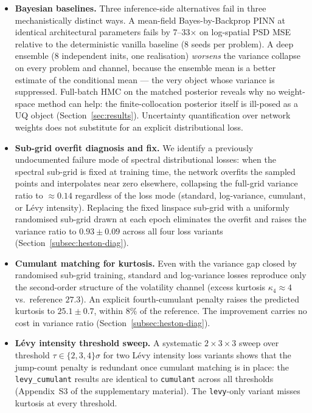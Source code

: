 \documentclass[review,12pt]{elsarticle}
\begin{document}
\begin{itemize}
\item \textbf{Bayesian baselines.} Three inference-side alternatives fail in
three mechanistically distinct ways. A mean-field Bayes-by-Backprop PINN at
identical architectural parameters fails by 7--33\(\times\) on log-spatial
PSD MSE relative to the deterministic vanilla baseline (8 seeds per
problem). A deep ensemble (8 independent inits, one realisation)
\emph{worsens} the variance collapse on every problem and channel, because
the ensemble mean is a better estimate of the conditional mean --- the very
object whose variance is suppressed. Full-batch HMC on the matched
posterior reveals why no weight-space method can help: the finite-collocation
posterior itself is ill-posed as a UQ object (Section~\ref{sec:results}).
Uncertainty quantification over network weights does not substitute for an
explicit distributional loss.

\item \textbf{Sub-grid overfit diagnosis and fix.} We identify a
previously undocumented failure mode of spectral distributional
losses: when the spectral sub-grid is fixed at training time, the
network overfits the sampled points and interpolates near zero
elsewhere, collapsing the full-grid variance ratio to \(\approx 0.14\)
regardless of the loss mode (standard, log-variance, cumulant, or
L\'evy intensity). Replacing the fixed linspace sub-grid with a
uniformly randomised sub-grid drawn at each epoch eliminates the
overfit and raises the variance ratio to \(0.93 \pm 0.09\) across all
four loss variants (Section~\ref{subsec:heston-diag}).

\item \textbf{Cumulant matching for kurtosis.} Even with the variance
gap closed by randomised sub-grid training, standard and log-variance
losses reproduce only the second-order structure of the volatility
channel (excess kurtosis \(\kappa_4 \approx 4\) vs.\ reference
\(27.3\)). An explicit fourth-cumulant penalty raises the predicted
kurtosis to \(25.1 \pm 0.7\), within 8\% of the reference. The
improvement carries no cost in variance ratio
(Section~\ref{subsec:heston-diag}).

\item \textbf{L\'evy intensity threshold sweep.} A systematic
\(2\times3\times3\) sweep over threshold \(\tau \in \{2, 3, 4\}\sigma\)
for two L\'evy intensity loss variants shows that the jump-count
penalty is redundant once cumulant matching is in place: the
\texttt{levy\_cumulant} results are identical to \texttt{cumulant}
across all thresholds (Appendix~S3 of the supplementary material). The
\texttt{levy}-only variant misses kurtosis at every threshold.


\end{itemize}
\end{document}
